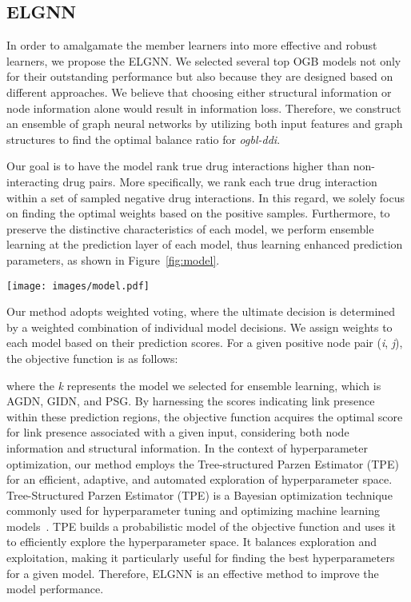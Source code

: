 \documentclass[11pt]{article}
\begin{document}
\subsection{ELGNN}
In order to amalgamate the member learners into more effective and robust learners, we propose the ELGNN. We selected several top OGB models not only for their outstanding performance but also because they are designed based on different approaches. We believe that choosing either structural information or node information alone would result in information loss. Therefore, we construct an ensemble of graph neural networks by utilizing both input features and graph structures to find the optimal balance ratio for \textit{ogbl-ddi}. 

 Our goal is to have the model rank true drug interactions higher than non-interacting drug pairs. More specifically, we rank each true drug interaction within a set of sampled negative drug interactions. In this regard, we solely focus on finding the optimal weights based on the positive samples. Furthermore, to preserve the distinctive characteristics of each model, we perform ensemble learning at the prediction layer of each model, thus learning enhanced prediction parameters, as shown in Figure~\ref{fig:model}. \
 
 \begin{figure*}[htbp]
    \centering
    \texttt{[image: images/model.pdf]}
    \caption{An overview of ELGNN architecture. 
    For the transductive setting, the input training graph and input test graph form the full graph. 
    The K represents the number of model ensembles, for here, K=3. }
    \label{fig:model}
\end{figure*}

Our method adopts weighted voting, where the ultimate decision is determined by a weighted combination of individual model decisions. We assign weights to each model based on their prediction scores. For a given positive node pair (\textit{i}, \textit{j}), the objective function is as follows:

where the \textit{k} represents the model we selected for ensemble learning, which is AGDN, GIDN, and PSG. By harnessing the scores indicating link presence within these prediction regions, the objective function acquires the optimal score for link presence associated with a given input, considering both node information and structural information. In the context of hyperparameter optimization, our method employs the Tree-structured Parzen Estimator (TPE) for an efficient, adaptive, and automated exploration of hyperparameter space. Tree-Structured Parzen Estimator (TPE) is a Bayesian optimization technique commonly used for hyperparameter tuning and optimizing machine learning models~\cite{bergstra2011algorithms}. TPE builds a probabilistic model of the objective function and uses it to efficiently explore the hyperparameter space. It balances exploration and exploitation, making it particularly useful for finding the best hyperparameters for a given model. Therefore, ELGNN is an effective method to improve the model performance. 
\end{document}
